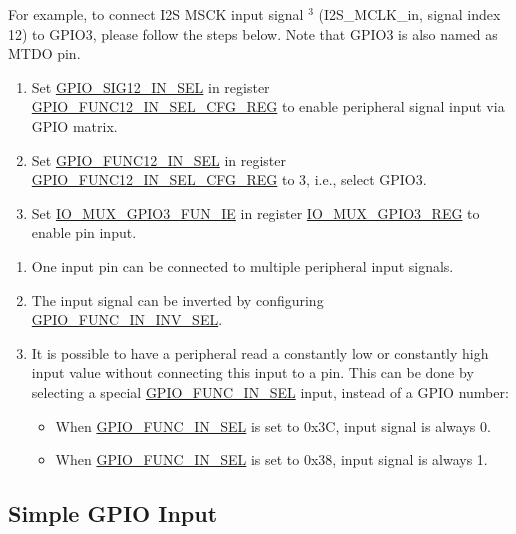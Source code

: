 \documentclass[main\_\_EN.tex]{subfiles}
\begin{document}
For example, to connect I2S MSCK input signal  \hyperref[input-note-3]{$^3$} (I2S\_MCLK\_in, signal index 12) to GPIO3, please follow the steps below. Note that GPIO3 is also named as MTDO pin.

\begin{enumerate}
\item Set \hyperref[regdesc:GPIOFUNCNINSELCFGREG]{GPIO\_SIG12\_IN\_SEL} in register  \hyperref[fielddesc:GPIOSIGNINSEL]{GPIO\_FUNC12\_IN\_SEL\_CFG\_REG} to enable peripheral signal input via GPIO matrix.
\item Set \hyperref[fielddesc:GPIOFUNCNINSEL]{GPIO\_FUNC12\_IN\_SEL} in register \hyperref[regdesc:GPIOFUNCNINSELCFGREG]{GPIO\_FUNC12\_IN\_SEL\_CFG\_REG} to 3, i.e., select GPIO3.
\item Set \hyperref[fielddesc:IOMUXGPIONFUNIE]{IO\_MUX\_GPIO3\_FUN\_IE} in register \hyperref[regdesc:IOMUXGPIONREG]{IO\_MUX\_GPIO3\_REG} to enable pin input.
\end{enumerate}

\begin{tiplisting}
\vspace{-2em}
\begin{enumerate}
\item \label{input-note-1} One input pin can be connected to multiple peripheral input signals.
\item \label{input-note-2} The input signal can be inverted by configuring \hyperref[fielddesc:GPIOFUNCNININVSEL]{GPIO\_FUNC\_IN\_INV\_SEL}.
\item \label{input-note-3} It is possible to have a peripheral read a constantly low or constantly high input value without connecting this input to a pin. This can be done by selecting a special \hyperref[fielddesc:GPIOFUNCNINSEL]{GPIO\_FUNC\_IN\_SEL} input, instead of a GPIO number:
\begin {itemize}
\item When \hyperref[fielddesc:GPIOFUNCNINSEL]{GPIO\_FUNC\_IN\_SEL} is set to 0x3C, input signal is always 0.
\item When \hyperref[fielddesc:GPIOFUNCNINSEL]{GPIO\_FUNC\_IN\_SEL} is set to 0x38, input signal is always 1.
\end{itemize}
\end{enumerate}
\end{tiplisting}

\subsection{Simple GPIO Input}\label{IOMUXSimpleGPIOInput}
\end{document}
